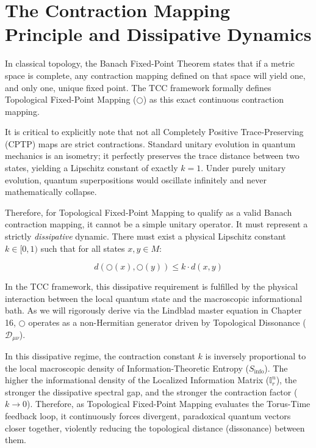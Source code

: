 \documentclass[12pt,openany]{book}
\theoremstyle{plain}
\theoremstyle{definition}
\theoremstyle{remark}
\begin{document}
\section{The Contraction Mapping Principle and Dissipative Dynamics}

In classical topology, the Banach Fixed-Point Theorem \cite{banach1922} states that if a metric space is complete, any contraction mapping defined on that space will yield one, and only one, unique fixed point. The TCC framework formally defines Topological Fixed-Point Mapping ($\bigcirc$) as this exact continuous contraction mapping. 

It is critical to explicitly note that not all Completely Positive Trace-Preserving (CPTP) maps are strict contractions. Standard unitary evolution in quantum mechanics is an isometry; it perfectly preserves the trace distance between two states, yielding a Lipschitz constant of exactly $k = 1$. Under purely unitary evolution, quantum superpositions would oscillate infinitely and never mathematically collapse.

Therefore, for Topological Fixed-Point Mapping to qualify as a valid Banach contraction mapping, it cannot be a simple unitary operator. It must represent a strictly \emph{dissipative} dynamic. There must exist a physical Lipschitz constant $k \in [0, 1)$ such that for all states $x, y \in M$:

\begin{equation}
d(\bigcirc(x), \bigcirc(y)) \le k \cdot d(x, y)
\end{equation}

In the TCC framework, this dissipative requirement is fulfilled by the physical interaction between the local quantum state and the macroscopic informational bath. As we will rigorously derive via the Lindblad master equation in Chapter 16, $\bigcirc$ operates as a non-Hermitian generator driven by Topological Dissonance ($\mathcal{D}_{\mu\nu}$). 

In this dissipative regime, the contraction constant $k$ is inversely proportional to the local macroscopic density of Information-Theoretic Entropy ($S_{\text{info}}$). The higher the informational density of the Localized Information Matrix ($\mathbb{I}_r^n$), the stronger the dissipative spectral gap, and the stronger the contraction factor ($k \to 0$). Therefore, as Topological Fixed-Point Mapping evaluates the Torus-Time feedback loop, it continuously forces divergent, paradoxical quantum vectors closer together, violently reducing the topological distance (dissonance) between them.
\end{document}
